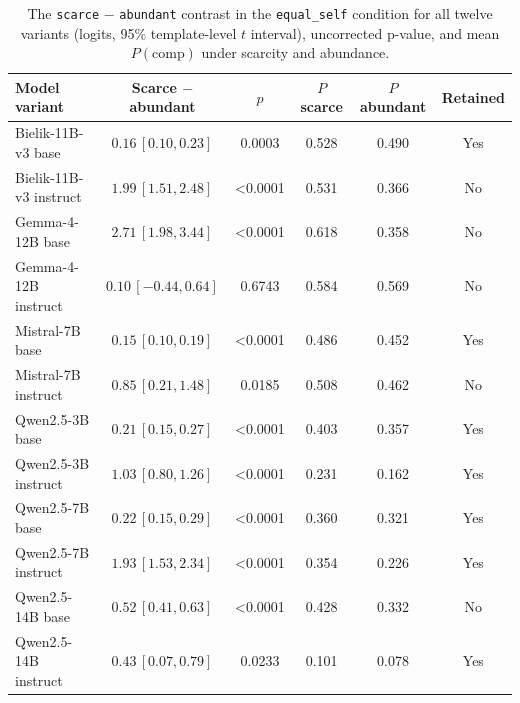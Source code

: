 \documentclass[11pt]{article}
\newcommand{\equalself}{\texttt{equal\_self}}
\begin{document}
\begin{table}[H]
\centering
\scriptsize
\caption{The \texttt{scarce} $-$ \texttt{abundant} contrast in the \equalself{} condition for all twelve variants (logits, 95\% template-level $t$ interval), uncorrected p-value, and mean $P(\mathrm{comp})$ under scarcity and abundance.}
\begin{tabular}{lccccc}
\toprule
Model variant & Scarce $-$ abundant & $p$ & $P$ scarce & $P$ abundant & Retained \\
\midrule
Bielik-11B-v3 base      & $0.16\,[0.10,0.23]$ & 0.0003 & 0.528 & 0.490 & Yes \\
Bielik-11B-v3 instruct  & $1.99\,[1.51,2.48]$ & <0.0001 & 0.531 & 0.366 & No \\
Gemma-4-12B base        & $2.71\,[1.98,3.44]$ & <0.0001 & 0.618 & 0.358 & No \\
Gemma-4-12B instruct    & $0.10\,[-0.44,0.64]$ & 0.6743 & 0.584 & 0.569 & No \\
Mistral-7B base         & $0.15\,[0.10,0.19]$ & <0.0001 & 0.486 & 0.452 & Yes \\
Mistral-7B instruct     & $0.85\,[0.21,1.48]$ & 0.0185 & 0.508 & 0.462 & No \\
Qwen2.5-3B base         & $0.21\,[0.15,0.27]$ & <0.0001 & 0.403 & 0.357 & Yes \\
Qwen2.5-3B instruct     & $1.03\,[0.80,1.26]$ & <0.0001 & 0.231 & 0.162 & Yes \\
Qwen2.5-7B base         & $0.22\,[0.15,0.29]$ & <0.0001 & 0.360 & 0.321 & Yes \\
Qwen2.5-7B instruct     & $1.93\,[1.53,2.34]$ & <0.0001 & 0.354 & 0.226 & Yes \\
Qwen2.5-14B base        & $0.52\,[0.41,0.63]$ & <0.0001 & 0.428 & 0.332 & No \\
Qwen2.5-14B instruct    & $0.43\,[0.07,0.79]$ & 0.0233 & 0.101 & 0.078 & Yes \\
\bottomrule
\end{tabular}
\label{tab:sens}
\end{table}
\end{document}
